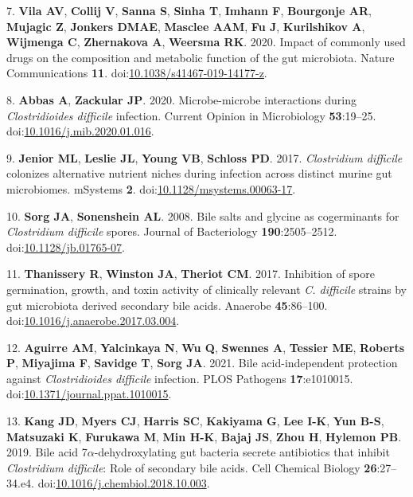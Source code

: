 \documentclass[
  12pt,
]{article}
\newenvironment{cslreferences}%
  {}%
  {\par}
\begin{document}
\begin{cslreferences}
\leavevmode\hypertarget{ref-VichVila2020}{}%
7. \textbf{Vila AV}, \textbf{Collij V}, \textbf{Sanna S}, \textbf{Sinha
T}, \textbf{Imhann F}, \textbf{Bourgonje AR}, \textbf{Mujagic Z},
\textbf{Jonkers DMAE}, \textbf{Masclee AAM}, \textbf{Fu J},
\textbf{Kurilshikov A}, \textbf{Wijmenga C}, \textbf{Zhernakova A},
\textbf{Weersma RK}. 2020. Impact of commonly used drugs on the
composition and metabolic function of the gut microbiota. Nature
Communications \textbf{11}.
doi:\href{https://doi.org/10.1038/s41467-019-14177-z}{10.1038/s41467-019-14177-z}.

\leavevmode\hypertarget{ref-Abbas2020}{}%
8. \textbf{Abbas A}, \textbf{Zackular JP}. 2020. Microbe-microbe
interactions during \emph{Clostridioides difficile} infection. Current
Opinion in Microbiology \textbf{53}:19--25.
doi:\href{https://doi.org/10.1016/j.mib.2020.01.016}{10.1016/j.mib.2020.01.016}.

\leavevmode\hypertarget{ref-Jenior2017}{}%
9. \textbf{Jenior ML}, \textbf{Leslie JL}, \textbf{Young VB},
\textbf{Schloss PD}. 2017. \emph{Clostridium difficile} colonizes
alternative nutrient niches during infection across distinct murine gut
microbiomes. mSystems \textbf{2}.
doi:\href{https://doi.org/10.1128/msystems.00063-17}{10.1128/msystems.00063-17}.

\leavevmode\hypertarget{ref-Sorg2008}{}%
10. \textbf{Sorg JA}, \textbf{Sonenshein AL}. 2008. Bile salts and
glycine as cogerminants for \emph{Clostridium difficile} spores. Journal
of Bacteriology \textbf{190}:2505--2512.
doi:\href{https://doi.org/10.1128/jb.01765-07}{10.1128/jb.01765-07}.

\leavevmode\hypertarget{ref-Thanissery2017}{}%
11. \textbf{Thanissery R}, \textbf{Winston JA}, \textbf{Theriot CM}.
2017. Inhibition of spore germination, growth, and toxin activity of
clinically relevant \emph{C. difficile} strains by gut microbiota
derived secondary bile acids. Anaerobe \textbf{45}:86--100.
doi:\href{https://doi.org/10.1016/j.anaerobe.2017.03.004}{10.1016/j.anaerobe.2017.03.004}.

\leavevmode\hypertarget{ref-Aguirre2021}{}%
12. \textbf{Aguirre AM}, \textbf{Yalcinkaya N}, \textbf{Wu Q},
\textbf{Swennes A}, \textbf{Tessier ME}, \textbf{Roberts P},
\textbf{Miyajima F}, \textbf{Savidge T}, \textbf{Sorg JA}. 2021. Bile
acid-independent protection against \emph{Clostridioides difficile}
infection. PLOS Pathogens \textbf{17}:e1010015.
doi:\href{https://doi.org/10.1371/journal.ppat.1010015}{10.1371/journal.ppat.1010015}.

\leavevmode\hypertarget{ref-Kang2019}{}%
13. \textbf{Kang JD}, \textbf{Myers CJ}, \textbf{Harris SC},
\textbf{Kakiyama G}, \textbf{Lee I-K}, \textbf{Yun B-S},
\textbf{Matsuzaki K}, \textbf{Furukawa M}, \textbf{Min H-K},
\textbf{Bajaj JS}, \textbf{Zhou H}, \textbf{Hylemon PB}. 2019. Bile acid
7\(\alpha\)-dehydroxylating gut bacteria secrete antibiotics that
inhibit \emph{Clostridium difficile}: Role of secondary bile acids. Cell
Chemical Biology \textbf{26}:27--34.e4.
doi:\href{https://doi.org/10.1016/j.chembiol.2018.10.003}{10.1016/j.chembiol.2018.10.003}.


\end{cslreferences}
\end{document}
